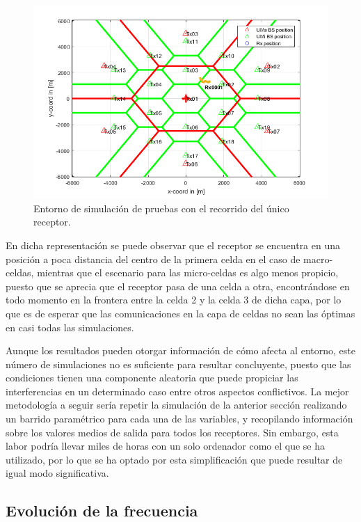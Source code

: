 \begin{figure}[h!]
	\centering
    \includegraphics[width=0.8\linewidth]{imagenes/representacion_pruebas_entorno.png}
	\caption{Entorno de simulación de pruebas con el recorrido del único receptor.}
	\label{fig:recorrido_pruebas}
\end{figure}

En dicha representación se puede observar que el receptor se encuentra en una posición a poca distancia del centro de la primera celda en el caso de macro-celdas, mientras que el escenario para las micro-celdas es algo menos propicio, puesto que se aprecia que el receptor pasa de una celda a otra, encontrándose en todo momento en la frontera entre la celda 2 y la celda 3 de dicha capa, por lo que es de esperar que las comunicaciones en la capa de celdas no sean las óptimas en casi todas las simulaciones.

Aunque los resultados pueden otorgar información de cómo afecta al entorno, este número de simulaciones no es suficiente para resultar concluyente, puesto que las condiciones tienen una componente aleatoria que puede propiciar las interferencias en un determinado caso entre otros aspectos conflictivos. La mejor metodología a seguir sería repetir la simulación de la anterior sección realizando un barrido paramétrico para cada una de las variables, y recopilando información sobre los valores medios de salida para todos los receptores. Sin embargo, esta labor podría llevar miles de horas con un solo ordenador como el que se ha utilizado, por lo que se ha optado por esta simplificación que puede resultar de igual modo significativa.

\subsection{Evolución de la frecuencia}

